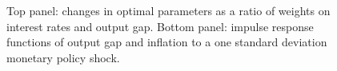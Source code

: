 \begin{figure}[!h]
\begin{center}
      \mbox{} \hspace{5 mm}
\mbox{}
  \caption{\label{nkpc_irfs} Top panel: changes in optimal parameters as a ratio of weights on interest rates and output gap. Bottom panel: impulse response functions of output gap and inflation to a one standard deviation monetary policy shock.}
    \end{center}
\end{figure}

